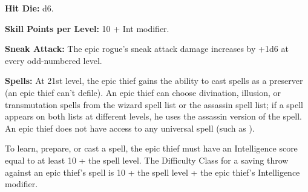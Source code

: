 

\textbf{Hit Die:} d6.

\textbf{Skill Points per Level:} 10 + Int modifier.

\textbf{Sneak Attack:} The epic rogue's sneak attack damage increases by +1d6 at every odd-numbered level.

\textbf{Spells:} At 21st level, the epic thief gains the ability to cast spells as a preserver (an epic thief can't defile). An epic thief can choose divination, illusion, or transmutation spells from the wizard spell list or the assassin spell list; if a spell appears on both lists at different levels, he uses the assassin version of the spell. An epic thief does not have access to any universal spell (such as ).


To learn, prepare, or cast a spell, the epic thief must have an Intelligence score equal to at least 10 + the spell level. The Difficulty Class for a saving throw against an epic thief's spell is 10 + the spell level + the epic thief's Intelligence modifier.

